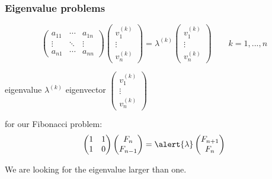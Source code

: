 \begin{frame}[fragile]\frametitle{Eigenvalue problems}
 \begin{displaymath}
  \begin{pmatrix}
   a_{11} & \cdots & a_{1n} \\
   \vdots & \ddots & \vdots \\
   a_{n1} & \cdots & a_{nn}
  \end{pmatrix}\begin{pmatrix}
   v_1^{(k)} \\ \vdots \\ v_n^{(k)}
  \end{pmatrix} = \lambda^{(k)}
  \begin{pmatrix}
   v_1^{(k)} \\ \vdots \\ v_n^{(k)}
  \end{pmatrix}\qquad k=1,..., n
 \end{displaymath}

 \begin{center}
  eigenvalue $\lambda^{(k)}$\qquad\qquad
  eigenvector $\begin{pmatrix}v_1^{(k)}\\\vdots\\v_n^{(k)}\end{pmatrix}$
 \end{center}

 for our Fibonacci problem:
   \begin{displaymath}
    \begin{pmatrix} 1 & 1 \\ 1 & 0 \end{pmatrix} 
    \begin{pmatrix} F_n \\ F_{n-1} \end{pmatrix} =
    \alert{\lambda}\begin{pmatrix} F_{n+1} \\ F_n \end{pmatrix}
   \end{displaymath}

 We are looking for the eigenvalue larger than one.
\end{frame}

